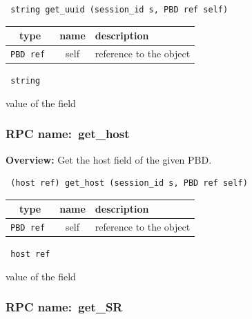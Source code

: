 \begin{verbatim} string get_uuid (session_id s, PBD ref self)\end{verbatim}



 
\vspace{0.3cm}
\begin{tabular}{|c|c|p{7cm}|}
 \hline
{\bf type} & {\bf name} & {\bf description} \\ \hline
{\tt PBD ref } & self & reference to the object \\ \hline 

\end{tabular}

\vspace{0.3cm}

{\tt 
string
}


value of the field
\vspace{0.3cm}
\vspace{0.3cm}
\vspace{0.3cm}
\subsubsection{RPC name:~get\_host}

{\bf Overview:} 
Get the host field of the given PBD.

\begin{verbatim} (host ref) get_host (session_id s, PBD ref self)\end{verbatim}



 
\vspace{0.3cm}
\begin{tabular}{|c|c|p{7cm}|}
 \hline
{\bf type} & {\bf name} & {\bf description} \\ \hline
{\tt PBD ref } & self & reference to the object \\ \hline 

\end{tabular}

\vspace{0.3cm}

{\tt 
host ref
}


value of the field
\vspace{0.3cm}
\vspace{0.3cm}
\vspace{0.3cm}
\subsubsection{RPC name:~get\_SR}

